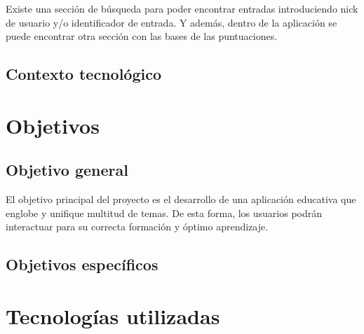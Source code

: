 \documentclass[a4paper, 12pt]{book}
\begin{document}
Existe una secci\'on de b\'usqueda para poder encontrar entradas introduciendo nick de usuario y/o identificador de entrada. Y adem\'as, dentro de la
aplicaci\'on se puede encontrar otra secci\'on con las bases de las puntuaciones.

\section{Contexto tecnol\'ogico}
\label{sec:contexto}









\cleardoublepage
\chapter{Objetivos}
\label{chap:objetivos}

\section{Objetivo general}
\label{sec:objetivo-general}
El objetivo principal del proyecto es el desarrollo de una aplicaci\'on educativa que englobe y unifique multitud de temas. De esta forma, los usuarios 
podr\'an interactuar para su correcta formaci\'on y \'optimo aprendizaje.

\section{Objetivos espec\'ificos}
\label{sec:objetivos-especificos}








\cleardoublepage
\chapter{Tecnolog\'ias utilizadas}
\end{document}
